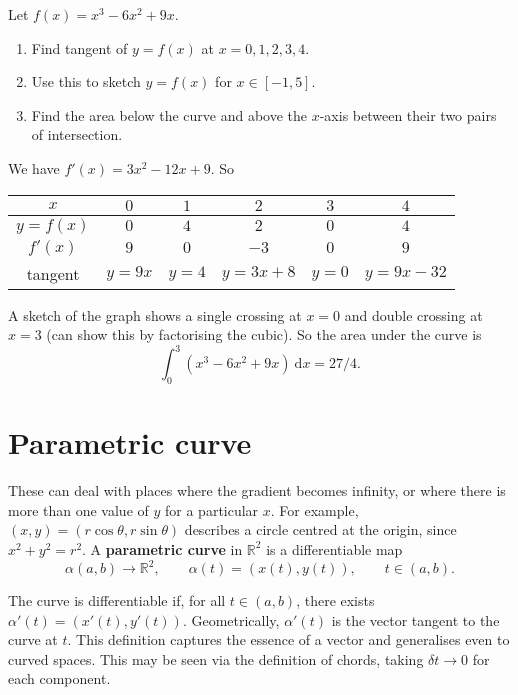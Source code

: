 \documentclass[letter-paper]{tufte-book}
\newenvironment{example}[1][Example]{\begin{trivlist}
\item[\hskip \labelsep {\bfseries #1}]}{\end{trivlist}}
\newcommand\Def[1]{\textbf{#1}}
\begin{document}
\begin{example}
	Let $f(x)=x^3-6x^2 + 9x$.
	\begin{enumerate}
		\item Find tangent of $y=f(x)$ at $x=0,1,2,3,4$.
		\item Use this to sketch $y=f(x)$ for $x\in[-1,5]$.
		\item Find the area below the curve and above the $x$-axis between their
		two pairs of intersection.
	\end{enumerate}
	
	We have $f'(x)=3x^2-12x+9$. So
	
	\begin{tabular}{|c|c|c|c|c|c|}
		\hline
		$x$ & $0$ & $1$ & $2$ & $3$ & $4$\\
		\hline
		$y=f(x)$ & $0$ & $4$ & $2$ & $0$ & $4$\\
		\hline
		$f'(x)$ & $9$ & $0$ & $-3$ & $0$ & $9$\\
		\hline
		tangent & $y=9x$ & $y=4$ & $y=3x+8$ & $y=0$ & $y=9x-32$\\
		\hline
	\end{tabular}
	
	A sketch of the graph shows a single crossing at $x=0$ and double crossing
	at $x=3$ (can show this by factorising the cubic). So the area under the
	curve is
	\begin{equation*}
		\int_0^3 (x^3-6x^2+9x)\ \mathrm{d}x=27/4.
	\end{equation*}
\end{example}


\section{Parametric curve}

These can deal with places where the gradient becomes infinity, or where there
is more than one value of $y$ for a particular $x$. For example,
$(x,y)=(r\cos\theta,r\sin\theta)$ describes a circle centred at the origin,
since $x^2 + y^2 = r^2$. A \Def{parametric curve} in $\mathbb{R}^2$ is a
differentiable map
\begin{equation*}
	\alpha(a,b)\rightarrow\mathbb{R}^2,\qquad \alpha(t)=(x(t),y(t)),\qquad
	t\in(a,b).
\end{equation*}

The curve is differentiable if, for all $t\in(a,b)$, there exists
$\alpha'(t)=(x'(t),y'(t))$. Geometrically, $\alpha'(t)$ is the vector tangent to
the curve at $t$. This definition captures the essence of a vector and
generalises even to curved spaces. This may be seen via the definition of
chords, taking $\delta t\rightarrow0$ for each component.
\end{document}

